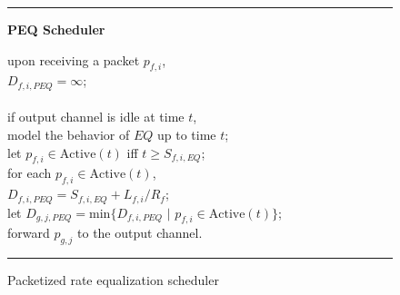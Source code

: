 
\begin{figure}
\noindent
\rule{\columnwidth}{0.5mm}
\centerline{\bf PEQ Scheduler}
\begin{tabbing}
\settabs
upon receiving a packet $p_{f,i}$,\\
\tea $D_{f,i,PEQ} = \infty$;\\
\\
if output channel is idle at time $t$,\\
\tea model the behavior of $EQ$ up to time $t$;\\
\tea let $p_{f,i} \in \mbox{Active}(t)$ iff $t \geq S_{f,i,EQ}$;\\
\tea for each $p_{f,i} \in \mbox{Active}(t)$,\\
\teb     $D_{f,i,PEQ} = S_{f,i,EQ} + L_{f,i}/R_f$;\\
\tea let $D_{g,j,PEQ} = \mbox{min}\{D_{f,i,PEQ}\,\,|\,\, p_{f,i} \in 
\mbox{Active}(t)\}$;\\
\tea forward $p_{g,j}$ to the output channel.
\end{tabbing}
\caption{Packetized rate equalization scheduler}
\label{fig:PEQ-scheduler}
\rule{\columnwidth}{0.5mm}
\end{figure}
